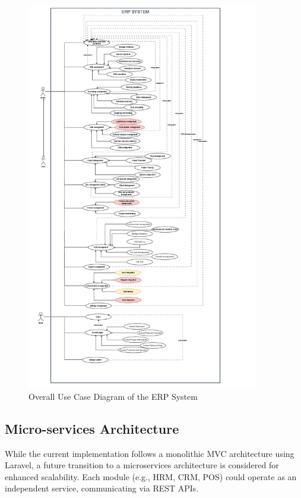 \begin{figure}[H]
    \centering
    \includegraphics[width=0.9\textwidth]{chapters/chapter 2/figures/diagramGeneralUseCase (1) (1).drawio (1)_page-0001 (1).jpg}
    \caption{Overall Use Case Diagram of the ERP System}
    \label{fig:overall_use_case}
\end{figure}

\subsection{Micro-services Architecture}
While the current implementation follows a monolithic MVC architecture using Laravel, a future transition to a microservices architecture is considered for enhanced scalability. Each module (e.g., HRM, CRM, POS) could operate as an independent service, communicating via REST APIs.

